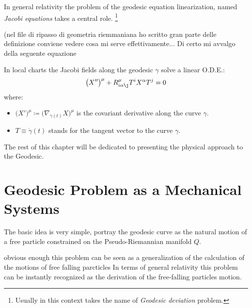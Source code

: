 \documentclass[Main]{subfiles}
\begin{document}
	In general relativity the problem of the geodesic equation linearization, named \emph{Jacobi equations} takes a central role. \footnote{Usually in this context takes the name of \emph{Geodesic deviation} problem\cite[pag. 46]{Wald1984}.}
	
	\danger 
	
	(nel file di ripasso di geometria riemmaniana ho scritto gran parte delle definizione conviene vedere cosa mi serve effettivamente...
	Di certo mi avvalgo della seguente  equazione
	
	\danger	
	
	\begin{notationfix}
		In local charts the Jacobi fields along the geodesic $\gamma$ solve a linear O.D.E.:
		\begin{equation}\label{JacobiEquationComponents}
			\big( X''\big)^\mu + R^\mu_{i \alpha \j} T^i X^\alpha T^j =0
		\end{equation}
		where:
		\begin{itemize}
			\item $\big(X'\big)^\mu \coloneqq \big( \nabla_{\dot{\gamma}(t)} X\big)^\mu$ is the covariant derivative along the curve $\gamma$.
			\item $T \equiv \dot{\gamma}(t)$ stands for the tangent vector to the curve $\gamma$.
		\end{itemize}
	
	\end{notationfix}
	
	
	
	
	The rest of this chapter will be dedicated to presenting the physical approach to the Geodesic.


\section{Geodesic Problem as a Mechanical Systems}
	The basic idea is very simple, portray the geodesic curve as the natural motion of a free particle constrained on the Pseudo-Riemannian manifold $Q$.
	
	\danger
	
	obvious enough this problem can be seen as a generalization of the calculation of the motions of free falling parcticles
	In terms of general relativity this problem can be instantly recognized as the derivation of the free-falling particles motion.
	
\end{document}
